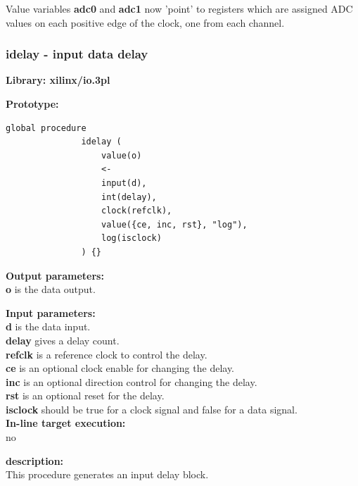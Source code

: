             Value variables {\bf adc0} and {\bf adc1} now 'point' to registers
            which are assigned ADC values on each positive edge of the clock,
            one from each channel.
            


        \subsubsection{idelay - input data delay}\label{sec:lpidelay}

            {\bf Library: xilinx/io.3pl}

            {\bf Prototype:} \\
            \vsp
            \begin{lstlisting}[gobble=12, language=threepl]
               global procedure
               idelay (
                   value(o)
                   <-
                   input(d),
                   int(delay),
                   clock(refclk),
                   value({ce, inc, rst}, "log"),
                   log(isclock)
               ) {}
            \end{lstlisting}

            {\bf Output parameters:} \\
            {\bf o} is the data output.

            {\bf Input parameters:} \\            
            {\bf d} is the data input.\\
            {\bf delay} gives a delay count.\\
            {\bf refclk} is a reference clock to control the delay.\\
            {\bf ce} is an optional clock enable for changing the delay.\\
            {\bf inc} is an optional direction control for changing the delay.\\
            {\bf rst} is an optional reset for the delay.\\
            {\bf isclock} should be true for a clock signal and false for a data
            signal.\\
         
            {\bf In-line target execution:} \\
            no

            {\bf description:} \\
            This procedure generates an input delay block.
            
